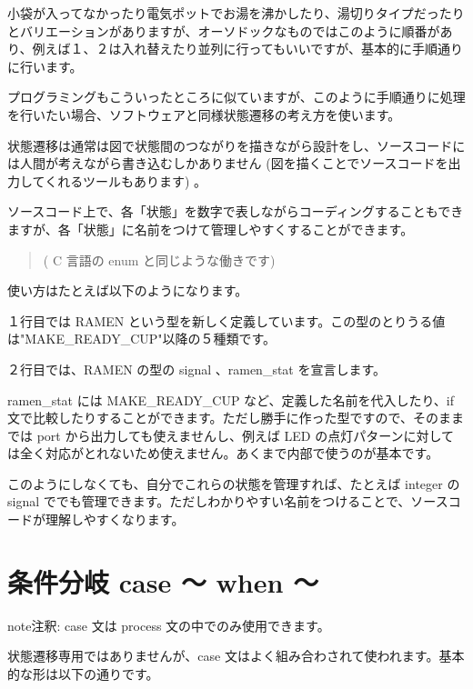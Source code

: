 \documentclass[letterpaper,10pt,dvipdfmx]{sphinxmanual}
\begin{document}
小袋が入ってなかったり電気ポットでお湯を沸かしたり、湯切りタイプだったりとバリエーションがありますが、オーソドックなものではこのように順番があり、例えば１、２は入れ替えたり並列に行ってもいいですが、基本的に手順通りに行います。

プログラミングもこういったところに似ていますが、このように手順通りに処理を行いたい場合、ソフトウェアと同様状態遷移の考え方を使います。

状態遷移は通常は図で状態間のつながりを描きながら設計をし、ソースコードには人間が考えながら書き込むしかありません (図を描くことでソースコードを出力してくれるツールもあります) 。

ソースコード上で、各「状態」を数字で表しながらコーディングすることもできますが、各「状態」に名前をつけて管理しやすくすることができます。
\begin{quote}

( C 言語の enum と同じような働きです)
\end{quote}

使い方はたとえば以下のようになります。

\begin{sphinxVerbatim}[commandchars=\\\{\}]
       
   
    
\end{sphinxVerbatim}

１行目では RAMEN という型を新しく定義しています。この型のとりうる値は"MAKE\_READY\_CUP"以降の５種類です。

２行目では、RAMEN の型の signal 、ramen\_stat を宣言します。

ramen\_stat には MAKE\_READY\_CUP など、定義した名前を代入したり、if 文で比較したりすることができます。ただし勝手に作った型ですので、そのままでは port から出力しても使えませんし、例えば LED の点灯パターンに対しては全く対応がとれないため使えません。あくまで内部で使うのが基本です。

このようにしなくても、自分でこれらの状態を管理すれば、たとえば integer の signal ででも管理できます。ただしわかりやすい名前をつけることで、ソースコードが理解しやすくなります。


\section{条件分岐 case ～ when ～}
\label{\detokenize{05_try:id28}}
\begin{sphinxadmonition}{note}{注釈:}
case 文は process 文の中でのみ使用できます。

状態遷移専用ではありませんが、case 文はよく組み合わされて使われます。基本的な形は以下の通りです。
\end{sphinxadmonition}
\end{document}
